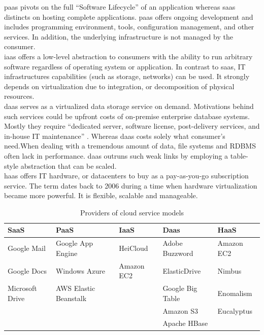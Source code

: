 \ac{paas} pivots on the full \enquote{Software Lifecycle} of an application whereas \ac{saas} distincts on hosting complete applications. \ac{paas} offers ongoing development and includes programming environment, tools, configuration management, and other services. In addition, the underlying infrastructure is not managed by the consumer. \cite{Mell2011}\\

\ac{iaas} offers a low-level abstraction to consumers with the ability to run arbitrary software regardless of operating system or application. In contrast to \ac{saas}, IT infrastructures capabilities (such as storage, networks) can be used. It strongly depends on virtualization due to integration, or decomposition of physical resources. \cite{Mell2011}\\

\ac{daas} serves as a virtualized data storage service on demand. Motivations behind such services could be upfront costs of on-premise enterprise database systems.\cite{Dillon2010} Mostly they require \enquote{dedicated server, software license, post-delivery services, and in-house IT maintenance} \cite{Dillon2010}. Whereas \ac{daas} costs solely what consumer's need.When dealing with a tremendous amount of data, file systems and RDBMS often lack in performance. \ac{daas} outruns such weak links by employing a table-style abstraction that can be scaled.\cite{Dillon2010}\\

\ac{haas} offers IT hardware, or datacenters to buy as a pay-as-you-go subscription service. The term dates back to 2006 during a time when hardware virtualization became more powerful. It is flexible, scalable and manageable.\cite{Wang2010}

\begin{table}[h]
    \centering
    \caption{Providers of cloud service models}
    \begin{tabularx}{\linewidth}{X|X|X|X|X}
        SaaS            & PaaS                  & IaaS       & Daas             & HaaS       \\ \hline
        Google Mail     & Google App Engine     & HeiCloud   & Adobe Buzzword   & Amazon EC2 \\
        Google Docs     & Windows Azure         & Amazon EC2 & ElasticDrive     & Nimbus     \\
        Microsoft Drive & AWS Elastic Beanstalk &            & Google Big Table & Enomalism  \\
                        &                       &            & Amazon S3        & Eucalyptus \\
                        &                       &            & Apache HBase     &            \\
    \end{tabularx}
    \label{tab:example-service-models}
\end{table}


